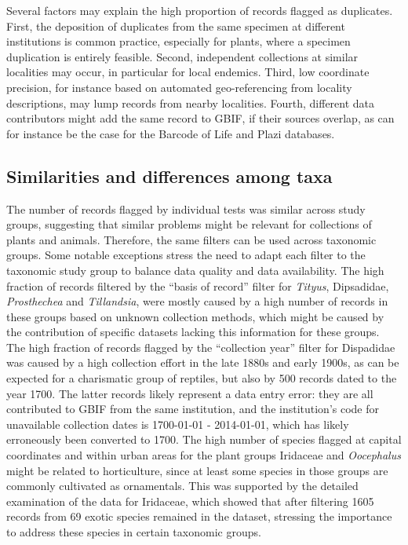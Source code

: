 \documentclass[fleqn,10pt,lineno]{wlpeerj} %
\begin{document}
Several factors may explain the high proportion of records flagged as duplicates. First, the deposition of duplicates from the same specimen at different institutions is common practice, especially for plants, where a specimen duplication is entirely feasible. Second, independent collections at similar localities may occur, in particular for local endemics. Third, low coordinate precision, for instance based on automated geo-referencing from locality descriptions, may lump records from nearby localities. Fourth, different data contributors might add the same record to GBIF, if their sources overlap, as can for instance be the case for the Barcode of Life and Plazi databases.

\hypertarget{similarities-and-differences-among-taxa}{%
\subsection*{Similarities and differences among taxa}\label{similarities-and-differences-among-taxa}}

The number of records flagged by individual tests was similar across study groups, suggesting that similar problems might be relevant for collections of plants and animals. Therefore, the same filters can be used across taxonomic groups. Some notable exceptions stress the need to adapt each filter to the taxonomic study group to balance data quality and data availability. The high fraction of records filtered by the ``basis of record'' filter for \emph{Tityus}, Dipsadidae, \emph{Prosthechea} and \emph{Tillandsia}, were mostly caused by a high number of records in these groups based on unknown collection methods, which might be caused by the contribution of specific datasets lacking this information for these groups. The high fraction of records flagged by the ``collection year'' filter for Dispadidae was caused by a high collection effort in the late 1880s and early 1900s, as can be expected for a charismatic group of reptiles, but also by 500 records dated to the year 1700. The latter records likely represent a data entry error: they are all contributed to GBIF from the same institution, and the institution's code for unavailable collection dates is 1700-01-01 - 2014-01-01, which has likely erroneously been converted to 1700. The high number of species flagged at capital coordinates and within urban areas for the plant groups Iridaceae and \emph{Oocephalus} might be related to horticulture, since at least some species in those groups are commonly cultivated as ornamentals. This was supported by the detailed examination of the data for Iridaceae, which showed that after filtering 1605 records from 69 exotic species remained in the dataset, stressing the importance to address these species in certain taxonomic groups.
\end{document}
